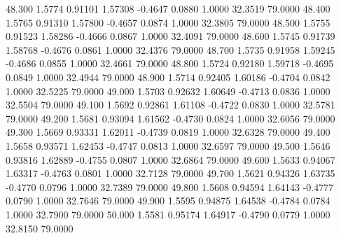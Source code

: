   48.300   1.5774   0.91101   1.57308  -0.4647   0.0880   1.0000  32.3519  79.0000
  48.400   1.5765   0.91310   1.57800  -0.4657   0.0874   1.0000  32.3805  79.0000
  48.500   1.5755   0.91523   1.58286  -0.4666   0.0867   1.0000  32.4091  79.0000
  48.600   1.5745   0.91739   1.58768  -0.4676   0.0861   1.0000  32.4376  79.0000
  48.700   1.5735   0.91958   1.59245  -0.4686   0.0855   1.0000  32.4661  79.0000
  48.800   1.5724   0.92180   1.59718  -0.4695   0.0849   1.0000  32.4944  79.0000
  48.900   1.5714   0.92405   1.60186  -0.4704   0.0842   1.0000  32.5225  79.0000
  49.000   1.5703   0.92632   1.60649  -0.4713   0.0836   1.0000  32.5504  79.0000
  49.100   1.5692   0.92861   1.61108  -0.4722   0.0830   1.0000  32.5781  79.0000
  49.200   1.5681   0.93094   1.61562  -0.4730   0.0824   1.0000  32.6056  79.0000
  49.300   1.5669   0.93331   1.62011  -0.4739   0.0819   1.0000  32.6328  79.0000
  49.400   1.5658   0.93571   1.62453  -0.4747   0.0813   1.0000  32.6597  79.0000
  49.500   1.5646   0.93816   1.62889  -0.4755   0.0807   1.0000  32.6864  79.0000
  49.600   1.5633   0.94067   1.63317  -0.4763   0.0801   1.0000  32.7128  79.0000
  49.700   1.5621   0.94326   1.63735  -0.4770   0.0796   1.0000  32.7389  79.0000
  49.800   1.5608   0.94594   1.64143  -0.4777   0.0790   1.0000  32.7646  79.0000
  49.900   1.5595   0.94875   1.64538  -0.4784   0.0784   1.0000  32.7900  79.0000
  50.000   1.5581   0.95174   1.64917  -0.4790   0.0779   1.0000  32.8150  79.0000
